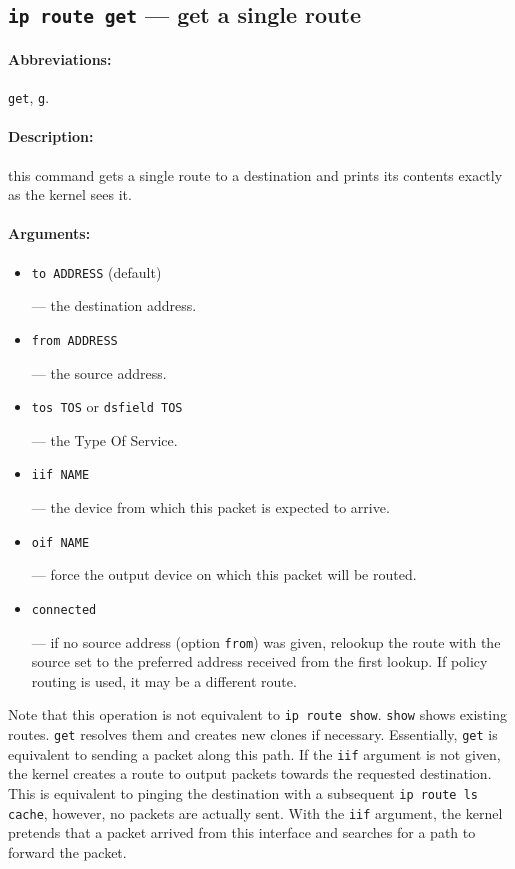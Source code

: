 \subsection{{\tt ip route get} --- get a single route}
\label{IP-ROUTE-GET}

\paragraph{Abbreviations:} \verb|get|, \verb|g|.

\paragraph{Description:} this command gets a single route to a destination
and prints its contents exactly as the kernel sees it.

\paragraph{Arguments:} 
\begin{itemize}
\item \verb|to ADDRESS| (default)

--- the destination address.

\item \verb|from ADDRESS|

--- the source address.

\item \verb|tos TOS| or \verb|dsfield TOS|

--- the Type Of Service.

\item \verb|iif NAME|

--- the device from which this packet is expected to arrive.

\item \verb|oif NAME|

--- force the output device on which this packet will be routed.

\item \verb|connected|

--- if no source address (option \verb|from|) was given, relookup
the route with the source set to the preferred address received from the first lookup.
If policy routing is used, it may be a different route.

\end{itemize}

Note that this operation is not equivalent to \verb|ip route show|.
\verb|show| shows existing routes. \verb|get| resolves them and
creates new clones if necessary. Essentially, \verb|get|
is equivalent to sending a packet along this path.
If the \verb|iif| argument is not given, the kernel creates a route
to output packets towards the requested destination.
This is equivalent to pinging the destination
with a subsequent {\tt ip route ls cache}, however, no packets are
actually sent. With the \verb|iif| argument, the kernel pretends
that a packet arrived from this interface and searches for
a path to forward the packet.

